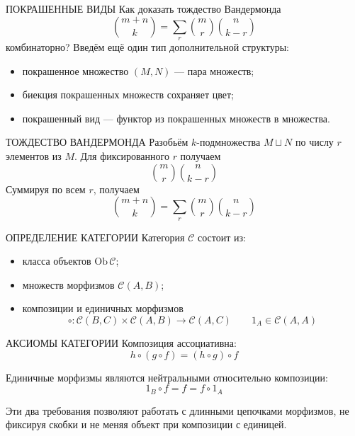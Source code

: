 \documentclass[aspectratio=169,11pt]{beamer}
\begin{document}
\begin{cttextframe}{ПОКРАШЕННЫЕ ВИДЫ}
Как доказать тождество Вандермонда
\[
  \binom{m+n}k=\sum_r\binom mr\binom n{k-r}
\]
комбинаторно? Введём ещё один тип дополнительной структуры:
\begin{itemize}
  \item покрашенное множество $(M,N)$ — пара множеств;
  \item биекция покрашенных множеств сохраняет цвет;
  \item покрашенный вид — функтор из покрашенных множеств в множества.
\end{itemize}
\end{cttextframe}

\begin{ctbottomframe}[illustration=30]{ТОЖДЕСТВО ВАНДЕРМОНДА}{%
}
Разобьём $k$-подмножества $M\sqcup N$ по числу $r$ элементов из $M$.
Для фиксированного $r$ получаем
\small
\[
  \binom mr\binom n{k-r}
\]
\normalsize
Суммируя по всем $r$, получаем
\small
\[
  \binom{m+n}k=\sum_r\binom mr\binom n{k-r}
\]
\end{ctbottomframe}


\begin{ctbottomframe}[illustration=40]{ОПРЕДЕЛЕНИЕ КАТЕГОРИИ}{%
}
Категория $\mathcal C$ состоит из:
\begin{itemize}
  \item класса объектов $\mathrm{Ob}\,\mathcal C$;
  \item множеств морфизмов $\mathcal C(A,B)$;
  \item композиции и единичных морфизмов
    \[
      \circ\colon\mathcal C(B,C)\times\mathcal C(A,B)
      \longrightarrow\mathcal C(A,C)
      \qquad
      1_A\in\mathcal C(A,A)
    \]
\end{itemize}
\end{ctbottomframe}

\begin{cttextframe}{АКСИОМЫ КАТЕГОРИИ}
Композиция ассоциативна:
\[
  h\circ(g\circ f)=(h\circ g)\circ f
\]

Единичные морфизмы являются нейтральными относительно композиции:
\[
  1_B\circ f=f=f\circ1_A
\]

Эти два требования позволяют работать с длинными цепочками морфизмов,
не фиксируя скобки и не меняя объект при композиции с единицей.
\end{cttextframe}
\end{document}

